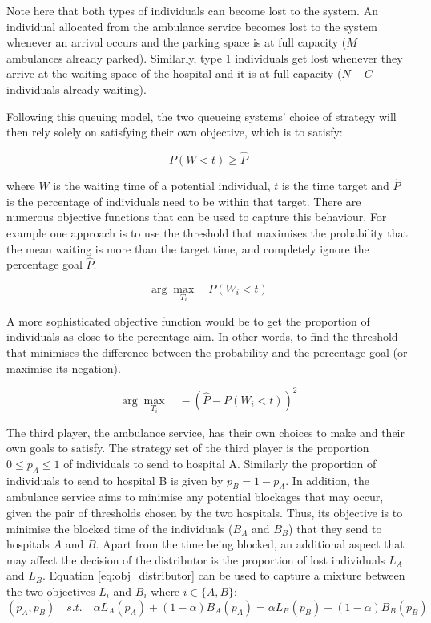 Note here that both types of individuals can become lost to the system. 
An individual allocated from the ambulance service becomes lost to the system 
whenever 
an arrival occurs and the parking space is at full capacity (\(M\) 
ambulances already parked).
Similarly, type 1 individuals get lost whenever they arrive at the waiting 
space of the hospital and it is at full capacity (\(N - C\) individuals already
waiting).

Following this queuing model, the two queueing systems' choice of strategy will 
then rely solely on satisfying their own 
objective, which is to satisfy:

\begin{equation}
    P(W < t) \geq \hat{P}
\end{equation}

where \(W\) is the waiting time of a potential individual, \(t\) is the time 
target and \(\hat{P}\) is the percentage of individuals need to be within that 
target. 
There are numerous objective functions that can be used to capture this 
behaviour. 
For example one approach is to use the threshold that maximises the probability 
that 
the mean waiting is more than the target time, and completely ignore the 
percentage goal \(\hat{P}\).

\begin{equation}
    \arg \max_{T_i} \quad P(W_i < t)
\end{equation}

A more sophisticated objective function would be to get the proportion 
of individuals as close to the percentage aim. 
In other words, to find the threshold that minimises the difference between the 
probability and the percentage goal (or maximise its negation).

\begin{equation}\label{eq:obj_queueing_systems}
    \arg \max_{T_i} \quad -\left( \hat{P} - P(W_i < t) \right)^2
\end{equation}

The third player, the ambulance service, has their own choices to make and 
their own 
goals to satisfy.
The strategy set of the third player is the proportion \(0 \leq p_A \leq 1\) of 
individuals to send to hospital A.
Similarly the proportion of individuals to send to hospital B is given by
\(p_B = 1 - p_A\).
In addition, the ambulance service aims to minimise any potential blockages
that may occur, given the pair of thresholds chosen by the two hospitals.
Thus, its objective is to minimise the blocked time of the individuals 
(\(B_A\) and \(B_B\))
that they send to hospitals \(A\) and \(B\).
Apart from the time being blocked, an additional aspect that may affect the 
decision of the distributor is the proportion of lost individuals 
\(L_A\) and \(L_B\).
Equation \ref{eq:obj_distributor} can be used to capture a mixture 
between the two objectives \(L_i\) and \(B_i\) where \(i \in \{A, B\}\):
\begin{equation}\label{eq:obj_distributor}
    (p_A, p_B) \quad s.t. \quad 
    \alpha L_A(p_A) + (1 - \alpha) B_A(p_A) = 
    \alpha L_B(p_B) + (1 - \alpha) B_B(p_B)
\end{equation}

